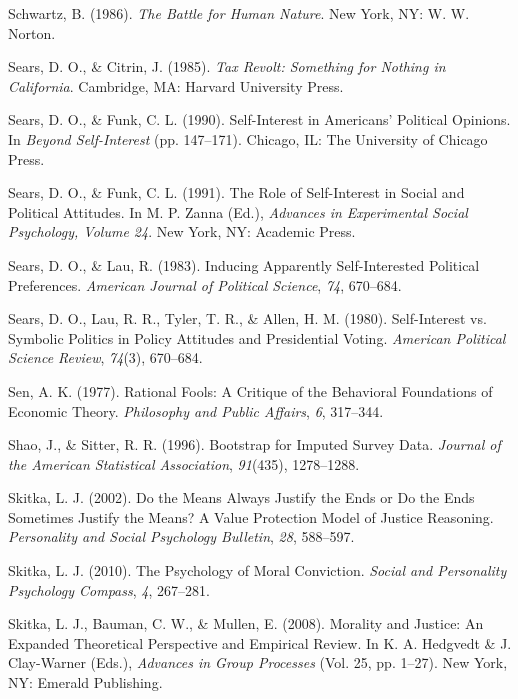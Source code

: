 \documentclass[12pt,econ]{sources/authesis}
\begin{document}
\leavevmode\hypertarget{ref-schwartz_battle_1986}{}%
Schwartz, B. (1986). \emph{The Battle for Human Nature}. New York, NY: W. W. Norton.

\leavevmode\hypertarget{ref-sears_tax_1985}{}%
Sears, D. O., \& Citrin, J. (1985). \emph{Tax Revolt: Something for Nothing in California}. Cambridge, MA: Harvard University Press.

\leavevmode\hypertarget{ref-sears_self-interest_1990}{}%
Sears, D. O., \& Funk, C. L. (1990). Self-Interest in Americans' Political Opinions. In \emph{Beyond Self-Interest} (pp. 147--171). Chicago, IL: The University of Chicago Press.

\leavevmode\hypertarget{ref-sears_role_1991}{}%
Sears, D. O., \& Funk, C. L. (1991). The Role of Self-Interest in Social and Political Attitudes. In M. P. Zanna (Ed.), \emph{Advances in Experimental Social Psychology, Volume 24}. New York, NY: Academic Press.

\leavevmode\hypertarget{ref-sears_inducing_1983}{}%
Sears, D. O., \& Lau, R. (1983). Inducing Apparently Self-Interested Political Preferences. \emph{American Journal of Political Science}, \emph{74}, 670--684.

\leavevmode\hypertarget{ref-sears_self-interest_1980}{}%
Sears, D. O., Lau, R. R., Tyler, T. R., \& Allen, H. M. (1980). Self-Interest vs. Symbolic Politics in Policy Attitudes and Presidential Voting. \emph{American Political Science Review}, \emph{74}(3), 670--684.

\leavevmode\hypertarget{ref-sen_rational_1977}{}%
Sen, A. K. (1977). Rational Fools: A Critique of the Behavioral Foundations of Economic Theory. \emph{Philosophy and Public Affairs}, \emph{6}, 317--344.

\leavevmode\hypertarget{ref-shao_1996_bootstrap}{}%
Shao, J., \& Sitter, R. R. (1996). Bootstrap for Imputed Survey Data. \emph{Journal of the American Statistical Association}, \emph{91}(435), 1278--1288.

\leavevmode\hypertarget{ref-skitka_2002_means}{}%
Skitka, L. J. (2002). Do the Means Always Justify the Ends or Do the Ends Sometimes Justify the Means? A Value Protection Model of Justice Reasoning. \emph{Personality and Social Psychology Bulletin}, \emph{28}, 588--597.

\leavevmode\hypertarget{ref-skitka_psychology_2010}{}%
Skitka, L. J. (2010). The Psychology of Moral Conviction. \emph{Social and Personality Psychology Compass}, \emph{4}, 267--281.

\leavevmode\hypertarget{ref-skitka_2008_morality}{}%
Skitka, L. J., Bauman, C. W., \& Mullen, E. (2008). Morality and Justice: An Expanded Theoretical Perspective and Empirical Review. In K. A. Hedgvedt \& J. Clay-Warner (Eds.), \emph{Advances in Group Processes} (Vol. 25, pp. 1--27). New York, NY: Emerald Publishing.
\end{document}
